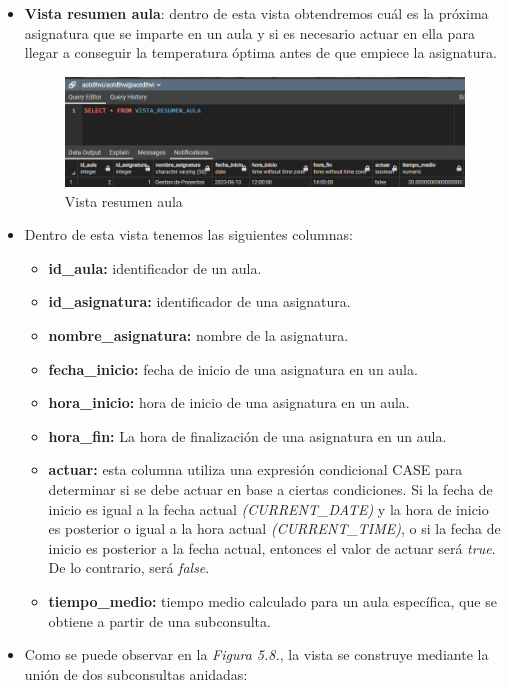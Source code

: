 \documentclass[12pt]{report}
\begin{document}
\begin{itemize}
    \item \textbf{Vista resumen aula}: dentro de esta vista obtendremos cuál es la próxima asignatura que se imparte en un aula y si es necesario actuar en ella para llegar a conseguir la temperatura óptima antes de que empiece la asignatura.
    \begin{figure}[H]
        \centering
        \includegraphics[scale = 0.65]{imagenes//base_de_datos/Vista_resumen_aula.png}
        \caption{Vista resumen aula}
        \label{fig:Figura}
    \end{figure}
    \item Dentro de esta vista tenemos las siguientes columnas:
    \begin{itemize}
        \item \textbf{id\_aula:} identificador de un aula.
        \item \textbf{id\_asignatura:} identificador de una asignatura.
        \item \textbf{nombre\_asignatura:} nombre de la asignatura.
        \item \textbf{fecha\_inicio:} fecha de inicio de una asignatura en un aula.
        \item \textbf{hora\_inicio:} hora de inicio de una asignatura en un aula.
        \item \textbf{hora\_fin:} La hora de finalización de una asignatura en un aula.
        \item \textbf{actuar:} esta columna utiliza una expresión condicional CASE para determinar si se debe actuar en base a ciertas condiciones. Si la fecha de inicio es igual a la fecha actual \textit{(CURRENT\_DATE)} y la hora de inicio es posterior o igual a la hora actual \textit{(CURRENT\_TIME)}, o si la fecha de inicio es posterior a la fecha actual, entonces el valor de actuar será \textit{true}. De lo contrario, será \textit{false}.
        \item \textbf{tiempo\_medio:} tiempo medio calculado para un aula específica, que se obtiene a partir de una subconsulta.
    \end{itemize}
    \item Como se puede observar en la \textit{Figura 5.8.}, la vista se construye mediante la unión de dos subconsultas anidadas:

\end{itemize}
\end{document}
